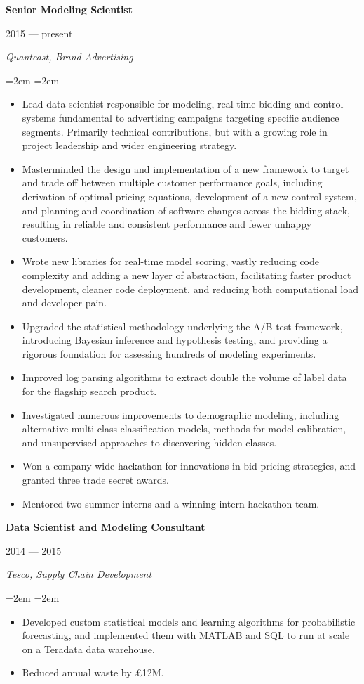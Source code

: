 \documentclass[letterpaper,10pt]{article}
\newcommand{\sepspace}{\vspace*{0.3em}}
\newcommand{\MainHeading}[1]{\noindent\textbf{#1}}
\newcommand{\SubHeading}[1]{\noindent\textit{#1}}
\newcommand{\DateBox}[1]{\colorbox{light-gray}{\parbox{8em}{\hfill\color{White}#1}}}
\newcommand{\Details}[1]{\hangindent=2em\hangafter=0\small#1\normalsize\par}
\newcommand{\WorkEntry}[4]{%
                \MainHeading{#1} \hfill \DateBox{#2} \par
                \SubHeading{#3} \par
                \noindent \hangindent=2em \hangafter=0 \Details{#4} }
\begin{document}
\WorkEntry{Senior Modeling Scientist}{2015 --- present}{Quantcast, Brand Advertising}{
\begin{itemize}
 \item Lead data scientist responsible for modeling, real time bidding and control systems fundamental to advertising campaigns targeting specific audience segments. Primarily technical contributions, but with a growing role in project leadership and wider engineering strategy.
 \item Masterminded the design and implementation of a new framework to target and trade off between multiple customer performance goals, including derivation of optimal pricing equations, development of a new control system, and planning and coordination of software changes across the bidding stack, resulting in reliable and consistent performance and fewer unhappy customers.
 \item Wrote new libraries for real-time model scoring, vastly reducing code complexity and adding a new layer of abstraction, facilitating faster product development, cleaner code deployment, and reducing both computational load and developer pain.
 \item Upgraded the statistical methodology underlying the A/B test framework, introducing Bayesian inference and hypothesis testing, and providing a rigorous foundation for assessing hundreds of modeling experiments.
 \item Improved log parsing algorithms to extract double the volume of label data for the flagship search product.
 \item Investigated numerous improvements to demographic modeling, including alternative multi-class classification models, methods for model calibration, and unsupervised approaches to discovering hidden classes.
 \item Won a company-wide hackathon for innovations in bid pricing strategies, and granted three trade secret awards.
 \item Mentored two summer interns and a winning intern hackathon team.%
\end{itemize}
}
\sepspace

\WorkEntry{Data Scientist and Modeling Consultant}{2014 --- 2015}{Tesco, Supply Chain Development}{
\begin{itemize}
 \item Developed custom statistical models and learning algorithms for probabilistic forecasting, and implemented them with MATLAB and SQL to run at scale on a Teradata data warehouse.
 \item Reduced annual waste by \pounds12M.
\end{itemize}
}
\sepspace
\end{document}
